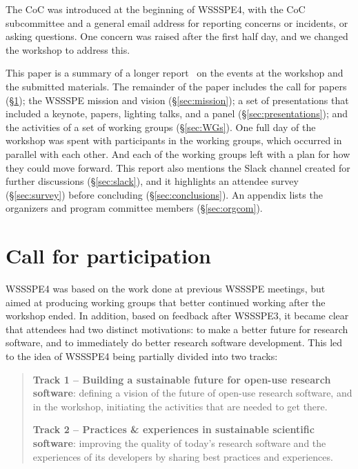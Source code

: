 \documentclass[11pt, oneside]{amsart}
\begin{document}
The CoC was introduced at the beginning of WSSSPE4, with the CoC subcommittee
and a general email address for reporting concerns or incidents, or
asking questions.  One concern was raised after the first half day, 
and we changed the workshop
to address this.

This paper is a summary of a longer report~\cite{WSSSPE4-report} on the events at the workshop and the submitted materials.
The remainder of the paper includes the call for papers (\S\ref{sec:preworkshop}); the WSSSPE mission and vision (\S\ref{sec:mission}); a set of presentations that included a keynote, papers, lighting talks, and a panel (\S\ref{sec:presentations}); and the activities of a set of working groups (\S\ref{sec:WGs}).  One full day of the
workshop was spent with participants in the working groups, which occurred in parallel
with each other.  And each of the working groups left with a plan for how they could move
forward.
This report also mentions the Slack channel created for further discussions (\S\ref{sec:slack}), and it highlights an attendee survey (\S\ref{sec:survey}) before concluding (\S\ref{sec:conclusions}).
An appendix lists the organizers and program committee members (\S\ref{sec:orgcom}).



\section{Call for participation} \label{sec:preworkshop}

WSSSPE4 was based on the work done at previous WSSSPE meetings, but aimed
at producing working groups that better continued working after the workshop ended.
In addition, based on feedback after WSSSPE3, it became clear that attendees
had two distinct motivations:  to make a better future
for research software, and to immediately do better research software development.
This led to the idea of WSSSPE4 being partially divided into two tracks:

\begin{quote}
    \textbf{Track 1 -- Building a sustainable future for open-use research
    software}: defining a vision of the future of open-use
    research software, and in the workshop, initiating the activities that are
    needed to get there.

    \noindent \textbf{Track 2 -- Practices \& experiences in sustainable scientific software}:
    improving the quality of today's research software and the
    experiences of its developers by sharing best practices and experiences.
\end{quote}
\end{document}
